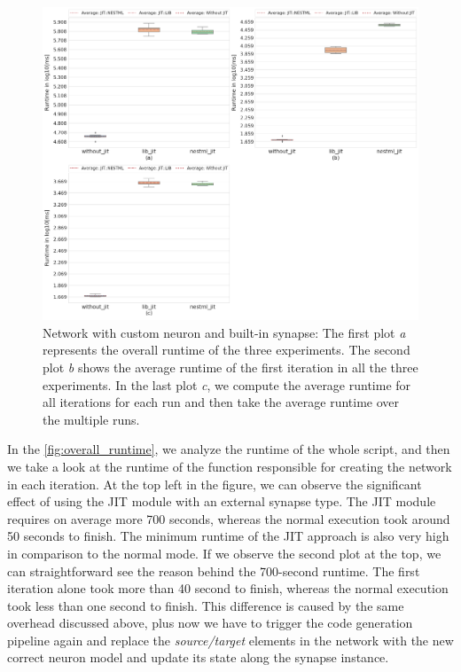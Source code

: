 \begin{figure}[ht!]
    \centering
    \includegraphics[width=\textwidth]{src/pic/three_plots.png}
    \caption{Network with custom neuron and built-in synapse: The first plot \emph{a} represents the overall runtime of the three experiments. The second plot \emph{b} shows the average runtime of the first iteration in all the three experiments. In the last plot \emph{c}, we compute the average runtime for all iterations for each run and then take the average runtime over the multiple runs. }
    \label{fig:overall_runtime}
\end{figure}

In the \autoref{fig:overall_runtime}, we analyze the runtime of the whole script, and then we take a look at the runtime of the function responsible for creating the network in each iteration. At the top left in the figure, we can observe the significant effect of using the JIT module with an external synapse type.  The JIT module requires on average more 700 seconds, whereas the normal execution took around 50 seconds to finish. The minimum runtime of the JIT approach is also very high in comparison to the normal mode. If we observe the second plot at the top, we can straightforward see the reason behind the 700-second runtime. The first iteration alone took more than 40 second to finish, whereas the normal execution took less than one second to finish. This difference is caused by the same overhead discussed above, plus now we have to  trigger the code generation pipeline again and replace the \emph{source/target} elements in the network with the new correct neuron model and update its state along the synapse instance. 

